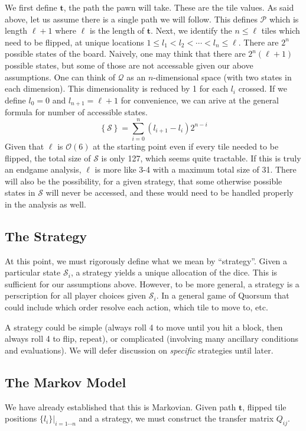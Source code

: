 \documentclass[letterpaper,11pt]{article}
\begin{document}
We first define $\mathbf{t}$, the path the pawn will take.
These are the tile values.  As said above, let us assume there is a single
path we will follow.  This defines $\mathcal{P}$ which is length $\ell+1$ where
$\ell$ is the length of $\mathbf{t}$.  Next, we identify the $n\leq \ell$ 
tiles which need to be flipped, at unique locations $1\leq l_1 < l_2 < \cdots < l_n \leq \ell$.  There are
$2^n$ possible states of the board.  Naively, one may think that there are
$2^n(\ell+1)$ possible states, but some of those are not accessable given our
above assumptions.  One can think of $\mathcal{Q}$ as an $n$-dimensional space
(with two states in each dimension).  This dimensionality is reduced by 1
for each $l_i$ crossed.  If we define $l_0=0$ and $l_{n+1}=\ell+1$ for
convenience, we can arive at the general formula for number of accessible
states.
\begin{equation}
	\left\{\mathcal{S}\right\} = \sum_{i=0}^{n} (l_{i+1}-l_i)2^{n-i}
\end{equation}
Given that $\ell$ is $\mathcal{O}(6)$ at the starting point even if every tile
needed to be flipped, the total size of $\mathcal{S}$ is only 127, which seems
quite tractable.  If this is truly an endgame analysis, $\ell$ is more like 3-4
with a maximum total size of 31.  There will also be the possibility, for a
given strategy, that some otherwise possible states in $\mathcal{S}$ will never
be accessed, and these would need to be handled properly in the analysis as
well.

\subsection{The Strategy}
At this point, we must rigorously define what we mean by ``strategy''.  Given
a particular state $\mathcal{S}_i$, a strategy yields a unique allocation of
the dice.  This is sufficient for our assumptions above.  However, to be more
general, a strategy is a perscription for all player choices given 
$\mathcal{S}_i$.  In a general game of Quorsum that could include which order
resolve each action, which tile to move to, etc.

A strategy could be simple (always roll 4 to move until you hit a block, then
always roll 4 to flip, repeat), or complicated (involving many ancillary
conditions and evaluations).  We will defer discussion on \textit{specific}
strategies until later.  

\subsection{The Markov Model}
We have already established that this is Markovian.  Given path $\mathbf{t}$,
flipped tile positions $\{l_i\}|_{i=1\cdots n}$ and a strategy, we must
construct the transfer matrix $Q_{ij}$.
\end{document}
